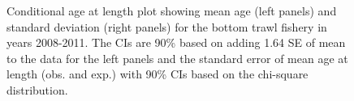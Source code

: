 \documentclass[
]{scrartcl}
\begin{document}
\begin{figure}[H]


\caption{\label{fig-call-plot-bt1}Conditional age at length plot showing
mean age (left panels) and standard deviation (right panels) for the
bottom trawl fishery in years 2008-2011. The CIs are 90\% based on
adding 1.64 SE of mean to the data for the left panels and the standard
error of mean age at length (obs. and exp.) with 90\% CIs based on the
chi-square distribution.}

\end{figure}%
\end{document}
